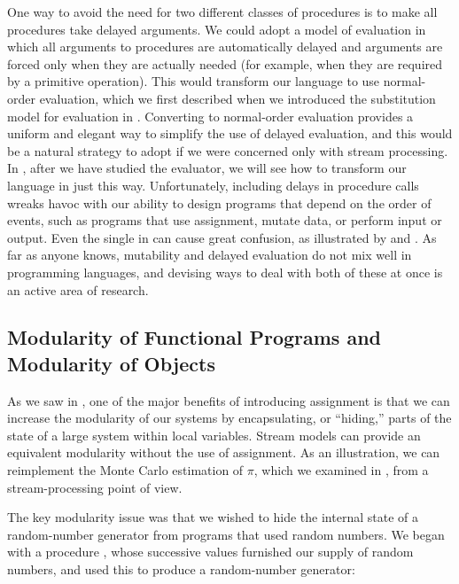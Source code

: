 One way to avoid the need for two different classes of procedures is to make
all procedures take delayed arguments.  We could adopt a model of evaluation in
which all arguments to procedures are automatically delayed and arguments are
forced only when they are actually needed (for example, when they are required
by a primitive operation).  This would transform our language to use
normal-order evaluation, which we first described when we introduced the
substitution model for evaluation in .  Converting to
normal-order evaluation provides a uniform and elegant way to simplify the use
of delayed evaluation, and this would be a natural strategy to adopt if we were
concerned only with stream processing.  In , after we have
studied the evaluator, we will see how to transform our language in just this
way.  Unfortunately, including delays in procedure calls wreaks havoc with our
ability to design programs that depend on the order of events, such as programs
that use assignment, mutate data, or perform input or output.  Even the single
 in  can cause great confusion, as illustrated by
 and .  As far as anyone knows,
mutability and delayed evaluation do not mix well in programming languages, and
devising ways to deal with both of these at once is an active area of research.

\subsection{Modularity of Functional Programs and Modularity of Objects}
\label{Section 3.5.5}

As we saw in , one of the major benefits of introducing
assignment is that we can increase the modularity of our systems by
encapsulating, or ``hiding,'' parts of the state of a large system within local
variables.  Stream models can provide an equivalent modularity without the use
of assignment.  As an illustration, we can reimplement the Monte Carlo
estimation of \( \pi \), which we examined in , from a
stream-processing point of view.

The key modularity issue was that we wished to hide the internal state of a
random-number generator from programs that used random numbers.  We began with
a procedure , whose successive values furnished our supply of
random numbers, and used this to produce a random-number generator:

